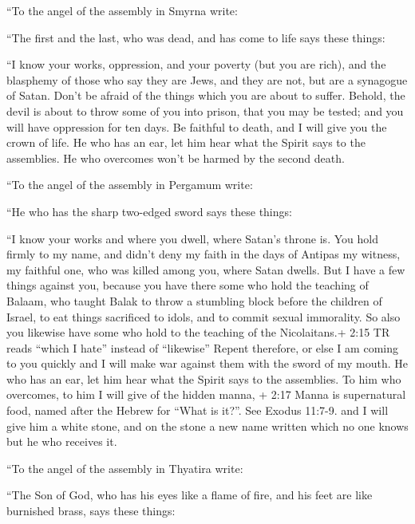  ``To the angel of the assembly in Smyrna write:

``The first and the last, who was dead, and has come to life says these
things:

 ``I know your works, oppression, and your poverty (but you
are rich), and the blasphemy of those who say they are Jews, and they
are not, but are a synagogue of Satan.  Don't be afraid of
the things which you are about to suffer. Behold, the devil is about to
throw some of you into prison, that you may be tested; and you will have
oppression for ten days. Be faithful to death, and I will give you the
crown of life.  He who has an ear, let him hear what the
Spirit says to the assemblies. He who overcomes won't be harmed by the
second death.

 ``To the angel of the assembly in Pergamum write:

``He who has the sharp two-edged sword says these things:

 ``I know your works and where you dwell, where Satan's
throne is. You hold firmly to my name, and didn't deny my faith in the
days of Antipas my witness, my faithful one, who was killed among you,
where Satan dwells.  But I have a few things against you,
because you have there some who hold the teaching of Balaam, who taught
Balak to throw a stumbling block before the children of Israel, to eat
things sacrificed to idols, and to commit sexual immorality.
 So also you likewise have some who hold to the teaching of
the Nicolaitans.+ 2:15 TR reads ``which I hate'' instead of ``likewise''
 Repent therefore, or else I am coming to you quickly and I
will make war against them with the sword of my mouth.  He
who has an ear, let him hear what the Spirit says to the assemblies. To
him who overcomes, to him I will give of the hidden manna, + 2:17 Manna
is supernatural food, named after the Hebrew for ``What is it?''. See
Exodus 11:7-9. and I will give him a white stone, and on the stone a new
name written which no one knows but he who receives it.

 ``To the angel of the assembly in Thyatira write:

``The Son of God, who has his eyes like a flame of fire, and his feet
are like burnished brass, says these things:

